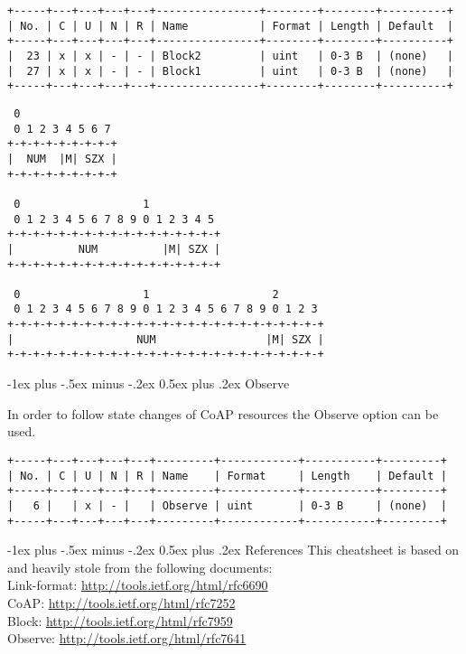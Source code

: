\documentclass[a4,10pt,landscape]{article}
\makeatletter
\renewcommand{\section}{\@startsection{section}{1}{0mm}%
                                {-1ex plus -.5ex minus -.2ex}%
                                {0.5ex plus .2ex}%
                                {\normalfont\large\bfseries}}
\makeatother
\begin{document}
\begin{multicols}{3}
{\tiny
\begin{verbatim}
+-----+---+---+---+---+----------------+--------+--------+----------+
| No. | C | U | N | R | Name           | Format | Length | Default  |
+-----+---+---+---+---+----------------+--------+--------+----------+
|  23 | x | x | - | - | Block2         | uint   | 0-3 B  | (none)   |
|  27 | x | x | - | - | Block1         | uint   | 0-3 B  | (none)   |
+-----+---+---+---+---+----------------+--------+--------+----------+
\end{verbatim}
}
{\tiny
\begin{verbatim}
 0
 0 1 2 3 4 5 6 7
+-+-+-+-+-+-+-+-+
|  NUM  |M| SZX |
+-+-+-+-+-+-+-+-+

 0                   1
 0 1 2 3 4 5 6 7 8 9 0 1 2 3 4 5
+-+-+-+-+-+-+-+-+-+-+-+-+-+-+-+-+
|          NUM          |M| SZX |
+-+-+-+-+-+-+-+-+-+-+-+-+-+-+-+-+

 0                   1                   2
 0 1 2 3 4 5 6 7 8 9 0 1 2 3 4 5 6 7 8 9 0 1 2 3
+-+-+-+-+-+-+-+-+-+-+-+-+-+-+-+-+-+-+-+-+-+-+-+-+
|                   NUM                 |M| SZX |
+-+-+-+-+-+-+-+-+-+-+-+-+-+-+-+-+-+-+-+-+-+-+-+-+
\end{verbatim}
}

\section{Observe}

In order to follow state changes of CoAP resources the Observe option
can be used.

{\tiny
\begin{verbatim}
+-----+---+---+---+---+---------+------------+-----------+---------+
| No. | C | U | N | R | Name    | Format     | Length    | Default |
+-----+---+---+---+---+---------+------------+-----------+---------+
|   6 |   | x | - |   | Observe | uint       | 0-3 B     | (none)  |
+-----+---+---+---+---+---------+------------+-----------+---------+
\end{verbatim}
}

\section{References}
This cheatsheet is based on and heavily stole from the following
documents:\\

{\tiny
Link-format: \url{http://tools.ietf.org/html/rfc6690}\\
CoAP: \url{http://tools.ietf.org/html/rfc7252}\\
Block: \url{http://tools.ietf.org/html/rfc7959}\\
Observe: \url{http://tools.ietf.org/html/rfc7641}\\
}
%
%
\end{multicols}
\end{document}
